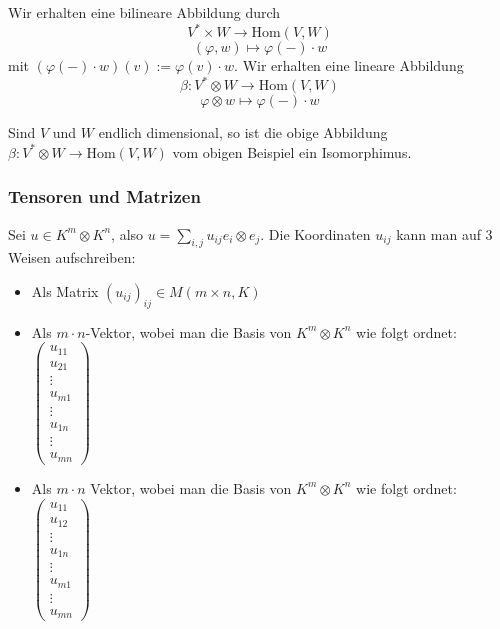 \documentclass[11pt, a4paper]{article}
\begin{document}
\begin{example}
Wir erhalten eine bilineare Abbildung durch 
$$
V^* \times W \rightarrow \mathrm{Hom}(V,W)
$$
$$
(\varphi, w) \mapsto \varphi (-) \cdot w
$$
mit  $ (\varphi (-) \cdot w) (v) := \varphi (v) \cdot w$.
Wir erhalten eine lineare Abbildung 
$$
\beta: V^* \otimes W \rightarrow \mathrm{Hom}(V, W)
$$
$$
\varphi \otimes w \mapsto \varphi (-) \cdot w
$$
\end{example}

\begin{theorem}
Sind $V$ und $W$ endlich dimensional, so ist die obige Abbildung $\beta:V^* \otimes W \rightarrow \mathrm{Hom}(V, W)$ vom obigen Beispiel ein Isomorphimus. 
\end{theorem}

\subsubsection{Tensoren und Matrizen}
Sei $u \in K^m \otimes K^n$, also $u = \sum\limits_{i, j} u_{ij} e_i \otimes e_j$.
Die Koordinaten $u_{ij}$ kann man auf 3 Weisen aufschreiben:
\begin{itemize}
\item Als Matrix $(u_{ij})_{ij} \in M(m \times n, K)$
\item Als $m \cdot n$-Vektor, wobei man die Basis von $K^m \otimes K^n$ wie folgt ordnet:
$\left(\begin{array}{c}
u_{11} \\
u_{21} \\
\vdots \\
u_{m1} \\
\vdots \\
u_{1n} \\
\vdots \\
u_{mn}
\end{array}\right)
$
\item Als $m \cdot  n$ Vektor, wobei man die Basis von $K^m \otimes K^n$ wie folgt ordnet: 
$\left(\begin{array}{c}
u_{11} \\
u_{12} \\
\vdots \\
u_{1n} \\
\vdots \\
u_{m1} \\
\vdots \\
u_{mn}
\end{array}\right)
$
\end{itemize}
\end{document}
